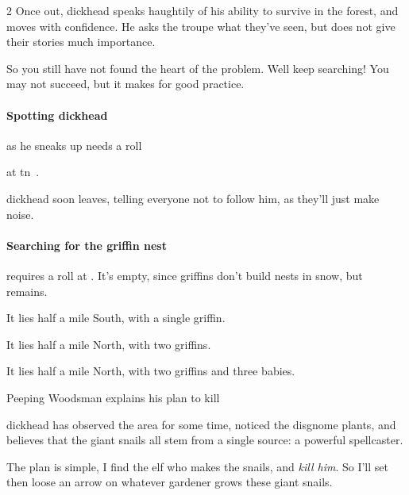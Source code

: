 \begin{multicols}{2}
Once out, \gls{dickhead} speaks haughtily of his ability to survive in the forest, and moves with confidence.
He asks the troupe what they've seen, but does not give their stories much importance.

\begin{speechtext}
  So you still have not found the heart of the problem.
  Well keep searching!
  You may not succeed, but it makes for good practice.
\end{speechtext}

\dickhead

\paragraph{Spotting \gls{dickhead}}
as he sneaks up needs a  roll
%
\addtocounter{track}{\value{Dexterity}}%
\addtocounter{track}{\value{Stealth}}%
at \gls{tn}~.

\Gls{dickhead} soon leaves, telling everyone not to follow him, as they'll just make noise.

\label{sunwayAirIngredients}
\paragraph{Searching for the \gls{griffin} nest}
requires a  roll at \tn[12].
\ifcase\value{temperature}%
  It's empty, since \glspl{griffin} don't build nests in snow, but  remains.

\or%
  It lies half a mile South, with a single \gls{griffin}.

\or
  It lies half a mile North, with two \glspl{griffin}.

\else
  It lies half a mile North, with two \glspl{griffin} and three babies.

\fi

{Peeping Woodsman}%
{ explains his plan to kill }%

\Gls{dickhead} has observed the area for some time, noticed the \gls{disgnome} plants, and believes that the giant snails all stem from a single source: a powerful spellcaster.

\begin{speechtext}
  The plan is simple, I find the elf who makes the snails, and \emph{kill him}.
  So I'll set  then loose an arrow on whatever gardener grows these giant snails.


\end{speechtext}
\end{multicols}

